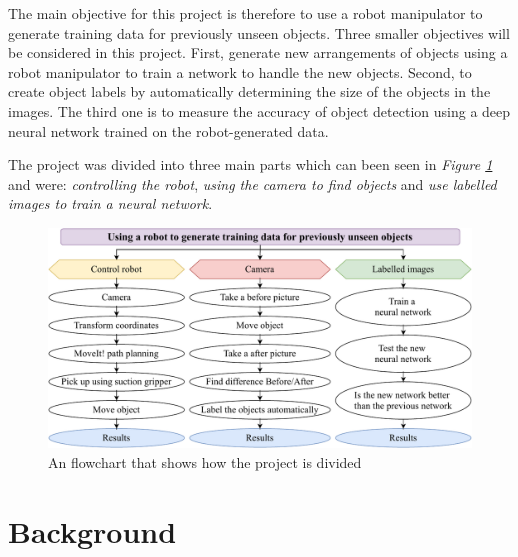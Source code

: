 The main objective for this project is therefore to use a robot manipulator to generate training data for previously unseen objects. 
Three smaller objectives will be considered in this project. 
First, generate new arrangements of objects using a robot manipulator to train a network to handle the new objects.  
Second, to create object labels by automatically determining the size of the objects in the images.
The third one is to measure the accuracy of object detection using a deep neural network trained on the robot-generated data.

The project was divided into three main parts which can been seen in \textit{Figure \ref{fig:project}} and were: \textit{controlling the robot}, \textit{using the camera to find objects} and \textit{use labelled images to train a neural network}. 
\begin{figure}[h]
    \centering
    \includegraphics[width=1\textwidth]{graphics/meis.pdf}
    \caption{An flowchart that shows how the project is divided}
    \label{fig:project}
\end{figure}


\section{Background}


